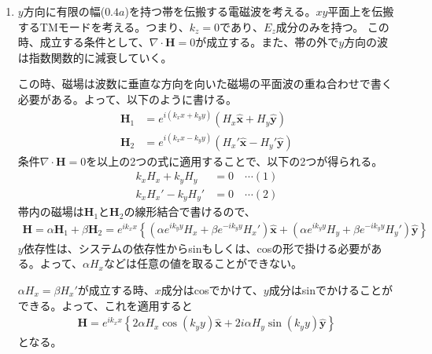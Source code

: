 \documentclass[a4paper,11pt,dvipdfmx]{jsarticle}
\begin{document}
\begin{enumerate}
\begin{itemize}
\begin{proof}
      \begin{align*}
        \boldsymbol{R}_{\perp} = \frac{l - n}{6} \hat{\boldsymbol{x}'} + \frac{m - n }{6} \hat{\boldsymbol{y}'}
      \end{align*}
      となる。$\hat{\boldsymbol{x}'}$と$\hat{\boldsymbol{y}'}$のなす角は、120°だから(111)面に射影すると120°ずつ分布し、三角格子となる。
    \end{proof}
\end{itemize}
\item $y$方向に有限の幅($0.4a$)を持つ帯を伝搬する電磁波を考える。$xy$平面上を伝搬するTMモードを考える。つまり、$k_z = 0であり、 E_z$成分のみを持つ。
  この時、成立する条件として、$\nabla \cdot \mathbf{H}=0$が成立する。また、帯の外で$y$方向の波は指数関数的に減衰していく。

  この時、磁場は波数に垂直な方向を向いた磁場の平面波の重ね合わせで書く必要がある。よって、以下のように書ける。
  \begin{align*}
    \mathbf{H}_1 &= e^{i(k_x x + k_y y)}(H_x \hat{\boldsymbol{x}} + H_y \hat{\boldsymbol{y}}) \\
    \mathbf{H}_2 &= e^{i(k_x x - k_y y)}(H_x' \hat{\boldsymbol{x}} - H_y' \hat{\boldsymbol{y}}) 
  \end{align*}
  条件$\nabla \cdot \mathbf{H}=0$を以上の2つの式に適用することで、以下の2つが得られる。
  \begin{align*}
    k_x H_x + k_y H_y &= 0 \quad \cdots (1) \\
    k_x H_x' - k_y H_y' &= 0 \quad \cdots (2)
  \end{align*}
  帯内の磁場は$\mathbf{H}_1$と$\mathbf{H}_2$の線形結合で書けるので、
  \begin{align*}
    \mathbf{H} = \alpha \mathbf{H}_1 + \beta \mathbf{H}_2 = e^{ik_x x} \left\{ (\alpha e^{ik_y y} H_x + \beta e^{- i k_y y} H_x' ) \hat{\boldsymbol{x}}  + (\alpha e^{ik_y y} H_y + \beta e^{- i k_y y} H_y' ) \hat{\boldsymbol{y}}\right\}
  \end{align*}
  $y$依存性は、システムの依存性からsinもしくは、cosの形で掛ける必要がある。よって、$\alpha H_x$などは任意の値を取ることができない。

  $\alpha H_x = \beta H_x'$が成立する時、$x$成分はcosでかけて、$y$成分はsinでかけることができる。よって、これを適用すると
  \begin{align*}
    \mathbf{H} = e^{i k_x x} \left\{ 2 \alpha H_x \cos \left( k_y y \right) \hat{\boldsymbol{x}} + 2 i \alpha H_y \sin \left( k_y y \right) \hat{\boldsymbol{y}} \right\}
  \end{align*}
  となる。


\end{enumerate}
\end{document}
